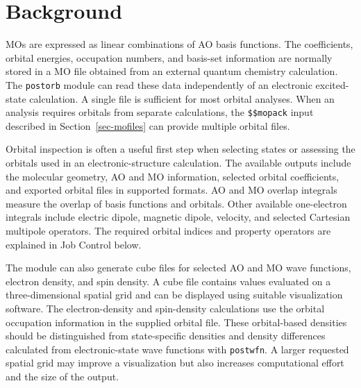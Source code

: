\section{Background}
MOs are expressed as linear combinations of AO basis functions. The coefficients, orbital energies, occupation numbers, and basis-set information are normally stored in a MO file obtained from an external quantum chemistry calculation. The \texttt{postorb} module can read these data independently of an electronic excited-state calculation. A single file is sufficient for most orbital analyses. When an analysis requires orbitals from separate calculations, the \texttt{\$\$mopack} input described in Section~\ref{sec-mofiles} can provide multiple orbital files.

Orbital inspection is often a useful first step when selecting states or assessing the orbitals used in an electronic-structure calculation. The available outputs include the molecular geometry, AO and MO information, selected orbital coefficients, and exported orbital files in supported formats. AO and MO overlap integrals measure the overlap of basis functions and orbitals. Other available one-electron integrals include electric dipole, magnetic dipole, velocity, and selected Cartesian multipole operators. The required orbital indices and property operators are explained in Job Control below.

The module can also generate cube files for selected AO and MO wave functions, electron density, and spin density. A cube file contains values evaluated on a three-dimensional spatial grid and can be displayed using suitable visualization software. The electron-density and spin-density calculations use the orbital occupation information in the supplied orbital file. These orbital-based densities should be distinguished from state-specific densities and density differences calculated from electronic-state wave functions with \texttt{postwfn}. A larger requested spatial grid may improve a visualization but also increases computational effort and the size of the output.
